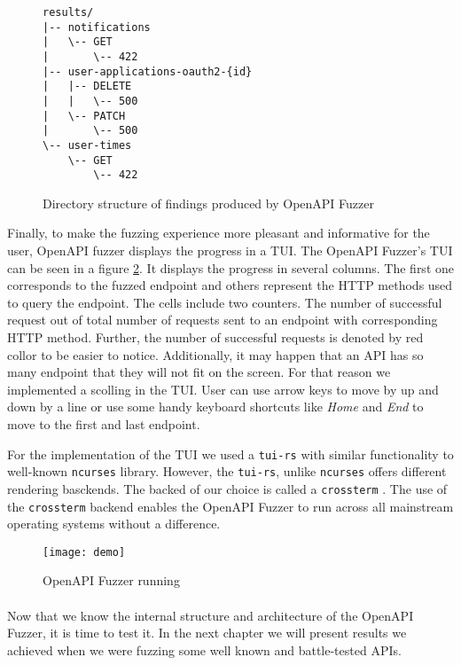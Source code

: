 \begin{figure}[h]
\begin{verbatim}
results/
|-- notifications
|   \-- GET
|       \-- 422
|-- user-applications-oauth2-{id}
|   |-- DELETE
|   |   \-- 500
|   \-- PATCH
|       \-- 500
\-- user-times
    \-- GET
        \-- 422
\end{verbatim}
\caption{Directory structure of findings produced by OpenAPI Fuzzer}
\label{fig:openapi-fuzzer-results}
\end{figure}

Finally, to make the fuzzing experience more pleasant and informative for the user, OpenAPI fuzzer displays the progress in a TUI. The OpenAPI Fuzzer's TUI can be seen in a figure \ref{fig:openapi-fuzzer-run}. It displays the progress in several columns. The first one corresponds to the fuzzed endpoint and others represent the HTTP methods used to query the endpoint. The cells include two counters. The number of successful request out of total number of requests sent to an endpoint with corresponding HTTP method. Further, the number of successful requests is denoted by red collor to be easier to notice. Additionally, it may happen that an API has so many endpoint that they will not fit on the screen. For that reason we implemented a scolling in the TUI. User can use arrow keys to move by up and down by a line or use some handy keyboard shortcuts like \textit{Home} and \textit{End} to move to the first and last endpoint.

For the implementation of the TUI we used a \texttt{tui-rs} \cite{tuirs2020github} with similar functionality to well-known \texttt{ncurses} library. However, the \texttt{tui-rs}, unlike \texttt{ncurses} offers different rendering basckends. The backed of our choice is called a \texttt{crossterm} \cite{crossterm2020github}. The use of the \texttt{crossterm} backend enables the OpenAPI Fuzzer to run across all mainstream operating systems without a difference.

\begin{figure}
\texttt{[image: demo]}
\caption{OpenAPI Fuzzer running}
\label{fig:openapi-fuzzer-run}
\end{figure}

\paragraph{}
Now that we know the internal structure and architecture of the OpenAPI Fuzzer, it is time to test it. In the next chapter we will present results we achieved when we were fuzzing some well known and battle-tested APIs.
